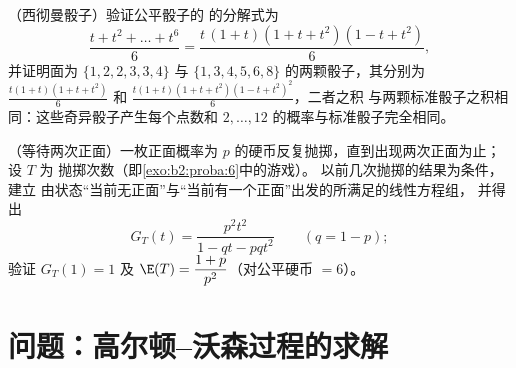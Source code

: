 \begin{exercise}[$\star\star$]\label{exo:b2:genfun:11}
（西彻曼骰子）验证公平骰子的
的分解式为
\[
\frac{t + t^2 + \dots + t^6}{6}
= \frac{t\,(1 + t)(1 + t + t^2)(1 - t + t^2)}{6},
\]
并证明面为 $\{1, 2, 2, 3, 3, 4\}$
与 $\{1, 3, 4, 5, 6, 8\}$ 的两颗骰子，其分别为
$\frac{t(1+t)(1+t+t^2)}6$ 和
$\frac{t(1+t)(1+t+t^2)(1-t+t^2)^2}6$，二者之积
与两颗标准骰子之积相同：这些奇异骰子产生每个点数和 $2,
\dots, 12$ 的概率与标准骰子完全相同。
\end{exercise}

\begin{exercise}[$\star\star\star$]\label{exo:b2:genfun:12}
（等待两次正面）一枚正面概率为
$p$ 的硬币反复抛掷，直到出现两次正面为止；设 $T$ 为
抛掷次数（即\cref{exo:b2:proba:6}中的游戏）。
以前几次抛掷的结果为条件，建立
由状态“当前无正面”与“当前有一个正面”出发的所满足的线性方程组，
并得出
\[
G_T(t) = \frac{p^2t^2}{1 - qt - pqt^2}
\qquad (q = 1 - p);
\]
验证 $G_T(1) = 1$ 及 $\E(T) = \dfrac{1 + p}{p^2}$（对公平硬币
$= 6$）。
\end{exercise}

\section{问题：高尔顿–沃森过程的求解}

